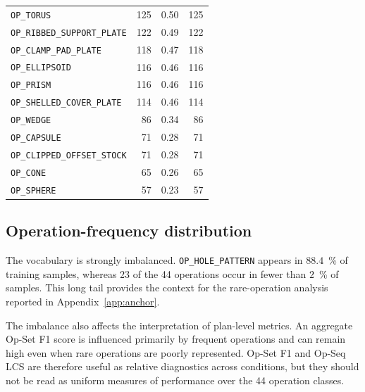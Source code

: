 \documentclass[preprint,12pt]{elsarticle}
\begin{document}
\begin{table}[htbp]
\begin{tabular}{lrrr}
    \texttt{OP\_TORUS}                  & 125       & 0.50                   & 125               \\
    \texttt{OP\_RIBBED\_SUPPORT\_PLATE} & 122       & 0.49                   & 122               \\
    \texttt{OP\_CLAMP\_PAD\_PLATE}      & 118       & 0.47                   & 118               \\
    \texttt{OP\_ELLIPSOID}              & 116       & 0.46                   & 116               \\
    \texttt{OP\_PRISM}                  & 116       & 0.46                   & 116               \\
    \texttt{OP\_SHELLED\_COVER\_PLATE}  & 114       & 0.46                   & 114               \\
    \texttt{OP\_WEDGE}                  & 86        & 0.34                   & 86                \\
    \texttt{OP\_CAPSULE}                & 71        & 0.28                   & 71                \\
    \texttt{OP\_CLIPPED\_OFFSET\_STOCK} & 71        & 0.28                   & 71                \\
    \texttt{OP\_CONE}                   & 65        & 0.26                   & 65                \\
    \texttt{OP\_SPHERE}                 & 57        & 0.23                   & 57                \\
    \bottomrule
  \end{tabular}
\end{table}

\subsection{Operation-frequency distribution}
\label{app:ir_distribution}

The vocabulary is strongly imbalanced. \texttt{OP\_HOLE\_PATTERN} appears in
$88.4$~\% of training samples, whereas 23 of the 44 operations occur in fewer than
$2$~\% of samples. This long tail provides the context for the rare-operation analysis reported
in Appendix~\ref{app:anchor}.

The imbalance also affects the interpretation of plan-level metrics. An aggregate Op-Set
F1 score is influenced primarily by frequent operations and can remain high even when
rare operations are poorly represented. Op-Set F1 and Op-Seq LCS are therefore useful as
relative diagnostics across conditions, but they should not be read as uniform measures of
performance over the 44 operation classes.
\end{document}
